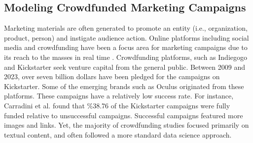 \subsection{Modeling Crowdfunded Marketing Campaigns}
\label{sec:modeling-social-media}
Marketing materials are often generated to promote an entity (i.e., organization, product, person) and 
instigate audience action. Online platforms including social media and crowdfunding have been a focus area for marketing campaigns due to its reach to the masses in real time \cite{kursuncu2019predictive}. Crowdfunding platforms, such as Indiegogo and Kickstarter %
seek venture capital from the general public.
Between 2009 and 2023, over seven billion dollars have been pledged for the campaigns on Kickstarter. Some of the emerging brands such as Oculus \cite{Carradini2023-ka} originated from these platforms.
These campaigns have a relatively low success rate. For instance, Carradini et al. \cite{Carradini2023-ka} 
found that \%38.76 of the Kickstarter campaigns were fully funded relative to unsuccessful campaigns.   Successful campaigns featured more images and links. Yet, the majority of crowdfunding studies focused primarily on textual content, 
and often followed a more standard data science approach. 
